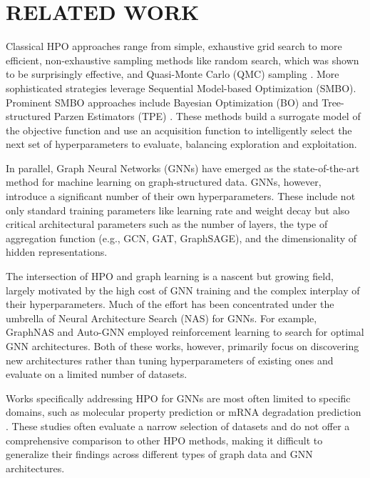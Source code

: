 \section{\uppercase{Related work}}\label{sec:related-work}

Classical HPO approaches range from simple, exhaustive grid search to more efficient, non-exhaustive sampling methods like random search, which was shown to be surprisingly effective, and Quasi-Monte Carlo (QMC) sampling \cite{bergstra_random_2012}. More sophisticated strategies leverage Sequential Model-based Optimization (SMBO). Prominent SMBO approaches include Bayesian Optimization (BO) and Tree-structured Parzen Estimators (TPE) \cite{bergstra_algorithms_2011}. These methods build a surrogate model of the objective function and use an acquisition function to intelligently select the next set of hyperparameters to evaluate, balancing exploration and exploitation.

In parallel, Graph Neural Networks (GNNs) have emerged as the state-of-the-art method for machine learning on graph-structured data. GNNs, however, introduce a significant number of their own hyperparameters. These include not only standard training parameters like learning rate and weight decay but also critical architectural parameters such as the number of layers, the type of aggregation function (e.g., GCN, GAT, GraphSAGE), and the dimensionality of hidden representations.

The intersection of HPO and graph learning is a nascent but growing field, largely motivated by the high cost of GNN training and the complex interplay of their hyperparameters. Much of the effort has been concentrated under the umbrella of Neural Architecture Search (NAS) for GNNs. For example, GraphNAS \cite{gao_graph_2020} and Auto-GNN \cite{zhou_auto-gnn_2022} employed reinforcement learning to search for optimal GNN architectures. Both of these works, however, primarily focus on discovering new architectures rather than tuning hyperparameters of existing ones and evaluate on a limited number of datasets.

Works specifically addressing HPO for GNNs are most often limited to specific domains, such as molecular property prediction \cite{yuan_genetic_2021, yuan_systematic_2021, yuan_which_2021, ebadi_hyperparameter_2025} or mRNA degradation prediction \cite{vodilovska_hyperparameter_2023}. These studies often evaluate a narrow selection of datasets and do not offer a comprehensive comparison to other HPO methods, making it difficult to generalize their findings across different types of graph data and GNN architectures.
